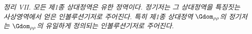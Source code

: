
\emph{정리 VII. 모든 제1종 상대정역은 유한 정역이다. 정기저는 그 상대정역을 특징짓는 사상영역에서 얻은 인볼루션기저로 주어진다. 특히 제1종 상대정역 $\Gdom_{\rho\rho}$의 정기저는 $\Gdom_{\rho\rho}$의 유일하게 정의되는 인볼루션기저로 주어진다.}

